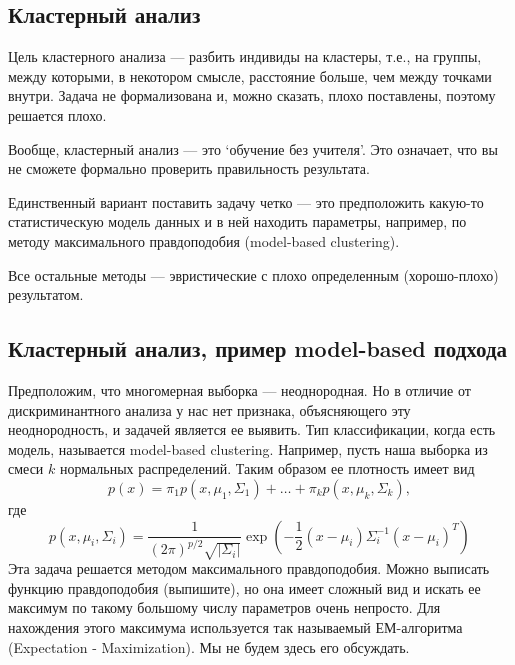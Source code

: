 \subsection{Кластерный анализ}

Цель кластерного анализа --- разбить индивиды на кластеры, т.е., на группы, между которыми, в некотором смысле,
расстояние больше, чем между точками внутри. Задача не формализована и, можно сказать, плохо поставлены,
 поэтому решается плохо.

Вообще, кластерный анализ --- это `обучение без учителя'. Это означает, что вы не сможете формально проверить правильность результата.

Единственный вариант поставить задачу четко --- это предположить какую-то статистическую модель данных и в ней находить
параметры, например, по методу максимального правдоподобия  (model-based clustering).

Все остальные методы --- эвристические с плохо определенным (хорошо-плохо) результатом.

\subsection{Кластерный	анализ,	пример	model-based	подхода}

Предположим, что многомерная выборка --- неоднородная. Но в отличие от дискриминантного анализа у нас нет признака, объясняющего эту неоднородность, и задачей является ее выявить.
Тип классификации, когда есть модель, называется model-based clustering.
Например, пусть наша выборка из смеси $k$ нормальных распределений. Таким образом ее плотность имеет вид
\begin{equation}
p(x) = \pi_1 p(x, \mu_1, \Sigma_1) + \ldots + \pi_k p(x, \mu_k, \Sigma_k),
\end{equation}
где
\begin{equation}
p(x, \mu_i, \Sigma_i) = \frac{1}{(2\pi)^{p/2}\sqrt{|\Sigma_i|}}
\exp \left(-\frac{1}{2}(x - \mu_i)\Sigma_i^{-1}(x - \mu_i)^T \right)
\end{equation}
Эта задача решается методом максимального правдоподобия. Можно выписать функцию правдоподобия (выпишите),
но она имеет сложный вид и искать ее максимум по такому большому числу параметров очень непросто.
Для нахождения этого максимума используется так называемый ЕМ-алгоритма (Expectation - Maximization).
Мы не будем здесь его обсуждать.



